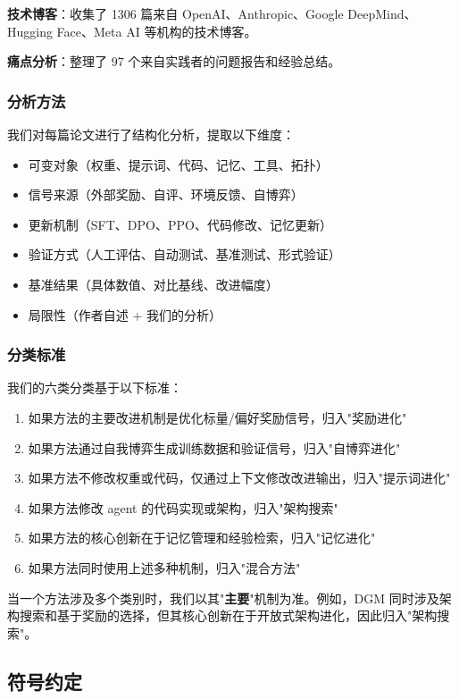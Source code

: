 \textbf{技术博客}：收集了 1306 篇来自 OpenAI、Anthropic、Google DeepMind、Hugging Face、Meta AI 等机构的技术博客。

\textbf{痛点分析}：整理了 97 个来自实践者的问题报告和经验总结。

\subsubsection{分析方法}

我们对每篇论文进行了结构化分析，提取以下维度：
\begin{itemize}
\item 可变对象（权重、提示词、代码、记忆、工具、拓扑）
\item 信号来源（外部奖励、自评、环境反馈、自博弈）
\item 更新机制（SFT、DPO、PPO、代码修改、记忆更新）
\item 验证方式（人工评估、自动测试、基准测试、形式验证）
\item 基准结果（具体数值、对比基线、改进幅度）
\item 局限性（作者自述 + 我们的分析）
\end{itemize}

\subsubsection{分类标准}

我们的六类分类基于以下标准：
\begin{enumerate}
\item 如果方法的主要改进机制是优化标量/偏好奖励信号，归入"奖励进化"
\item 如果方法通过自我博弈生成训练数据和验证信号，归入"自博弈进化"
\item 如果方法不修改权重或代码，仅通过上下文修改改进输出，归入"提示词进化"
\item 如果方法修改 agent 的代码实现或架构，归入"架构搜索"
\item 如果方法的核心创新在于记忆管理和经验检索，归入"记忆进化"
\item 如果方法同时使用上述多种机制，归入"混合方法"
\end{enumerate}

当一个方法涉及多个类别时，我们以其"\textbf{主要}"机制为准。例如，DGM 同时涉及架构搜索和基于奖励的选择，但其核心创新在于开放式架构进化，因此归入"架构搜索"。

\subsection{符号约定}\label{sec:intro-notation}

